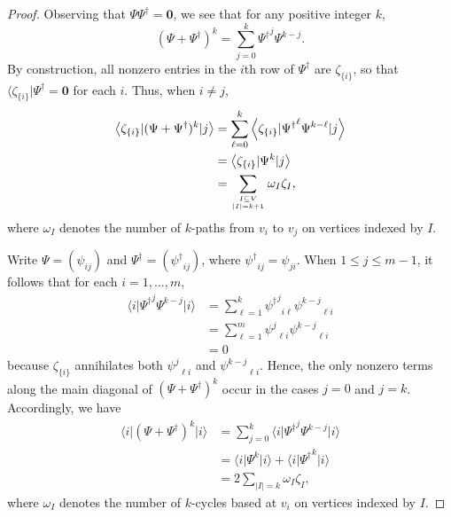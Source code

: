 \documentclass{article}
\theoremstyle{definition}
\newcommand{\zm}{\mathbf{0}}
\numberwithin{equation}{section}
\begin{document}
\begin{proof}
Observing that $\Psi\Psi^\dag=\zm$, we see that for any positive integer $k$, \begin{equation*}
(\Psi+\Psi^\dag)^k=\sum_{j=0}^k {\Psi^\dag}^j\Psi^{k-j}.
\end{equation*}
By construction, all nonzero entries in the $i$th row of $\Psi^\dag$ are $\zeta_{\{i\}}$, so that $\langle\zeta_{\{i\}}\vert \Psi^\dag=\zm$ for each $i$.  Thus, when $i\ne j$, 
\begin{align*}
\left<\zeta_{\{i\}}\vert(\Psi+\Psi^\dag)^k\vert j\right>&=\sum_{\ell=0}^k\left<\zeta_{\{i\}}\vert{\Psi^\dag}^\ell\Psi^{k-\ell}\vert j\right>\\
&=\left<\zeta_{\{i\}}\vert\Psi^k\vert j\right>\\
&=\sum_{\genfrac{}{}{0pt}{}{I\subseteq V}{|I|=k+1}}\omega_I \zeta_{I},\end{align*}
where $\omega_I$ denotes the number of $k$-paths from $v_i$ to $v_j$ on vertices indexed by $I$. 


Write $\Psi=(\psi_{ij})$ and $\Psi^\dag=({\psi^\dag}_{ij})$, where ${\psi^\dag}_{ij}=\psi_{ji}$.   When $1\le j\le m-1$, it follows that for each $i=1, \ldots, m$,  
\begin{align*}
\langle i\vert {\Psi^\dag}^j\Psi^{k-j}\vert i\rangle&=\sum_{\ell=1}^k {{\psi^\dag}^j}_{i\ell}{\psi^{k-j}}_{\ell i}\\
&=\sum_{\ell=1}^m {\psi^j}_{\ell i}{\psi^{k-j}}_{\ell i}\\
&=0
\end{align*}
because $\zeta_{\{i\}}$ annihilates both ${\psi^j}_{\ell i}$ and ${\psi^{k-j}}_{\ell i}$.  Hence, the only nonzero terms along the main diagonal of $(\Psi+\Psi^\dag)^k$ occur in the cases $j=0$ and $j=k$.  Accordingly, we have \begin{align*}
\langle i\vert(\Psi+\Psi^\dag)^k\vert i\rangle&=\sum_{j=0}^k \langle i\vert {\Psi^\dag}^j\Psi^{k-j}\vert i\rangle\\
&=\langle i\vert \Psi^{k}\vert i\rangle + \langle i\vert {\Psi^\dag}^k\vert i\rangle\\
&=2\sum_{|I|=k}\omega_I\zeta_I,
\end{align*}
where $\omega_I$ denotes the number of $k$-cycles based at $v_i$ on vertices indexed by $I$.
\end{proof}
\end{document}
